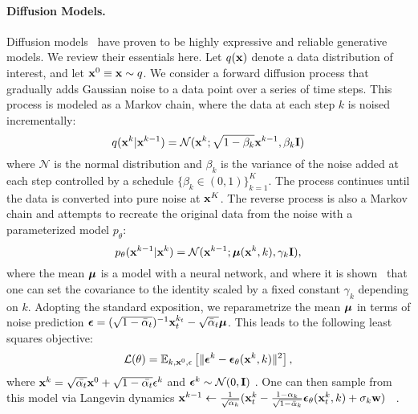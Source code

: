 \paragraph{Diffusion Models.}
Diffusion models~\cite{sohl2015deep,ho2020denoising} have proven to be highly expressive and reliable generative models.
We review their essentials here. Let $q(\mathbf{x})$ denote a data distribution of interest, and let $\mathbf{x}^0 \equiv \mathbf{x} \sim q$. We consider a forward diffusion process that gradually adds Gaussian noise to a data point over a series of time steps. This process is modeled as a Markov chain, where the data at each step \( k \) is noised incrementally:
\begin{equation}
    \label{eqn:forward_diffusion}
    q(\mathbf{x}^k|\mathbf{x}^{k-1}) = \mathcal{N}(\mathbf{x}^k; \sqrt{1-\beta_k}\mathbf{x}^{k-1}, \beta_k \mathbf{I})
\end{equation}
where \( \mathcal{N} \) is the normal distribution and \( \beta_k \) is the variance of the noise added at each step controlled by a schedule $\{\beta_k \in (0, 1)\}_{k=1}^K$. The process continues until the data is converted into pure noise at \( \mathbf{x}^K \).
The reverse process is also a Markov chain and attempts to recreate the original data from the noise with a parameterized model $p_\theta$:
\begin{equation}
    p_\theta(\mathbf{x}^{k-1}|\mathbf{x}^k) = \mathcal{N}(\mathbf{x}^{k-1}; \bm{\mu}(\mathbf{x}^k, k), \gamma_k \mathbf{I}),
\end{equation}
where the mean $\bm{\mu}$ is a model with a neural network, and where it is shown~\cite{ddpm} that one can set the covariance to the identity scaled by a fixed constant $\gamma_k$  depending on $k$. Adopting the standard exposition, we reparametrize the mean $\bm{\mu}$ in terms of noise prediction $\bm{\epsilon} = (\sqrt{1-\bar{\alpha}_t})^{-1}\mathbf{x}_t^{k_t}-\sqrt{\bar{\alpha}_t} \bm{\mu}$. This leads \cite{ho2020denoising}  to the following least squares objective: 
\begin{equation}
    \mathcal{L}(\theta) = \mathbb{E}_{k, \mathbf{x}^0, \epsilon}\left[\| \bm{\epsilon}^k - \bm{\epsilon}_\theta(\mathbf{x}^k, k) \|^2\right],
\end{equation}
where $\mathbf{x}^k = \sqrt{\bar{\alpha_t}}\mathbf{x}^0 +  \sqrt{1-\bar{\alpha_t}}\epsilon^k$ and $\bm{\epsilon}^k \sim \mathcal{N}(0,\mathbf{I})$ . One can then sample from this model via Langevin dynamics $\mathbf{x}^{k-1} \gets \frac{1}{\sqrt{\alpha_k}}(\mathbf{x}_t^{k} - \frac{1-\alpha_k}{\sqrt{1-\bar{\alpha}_k}}\bm{\epsilon}_{\theta}(\mathbf{x}_t^{k},k) + \sigma_k \mathbf{w})$ ~\cite{ho2020denoising}. 

